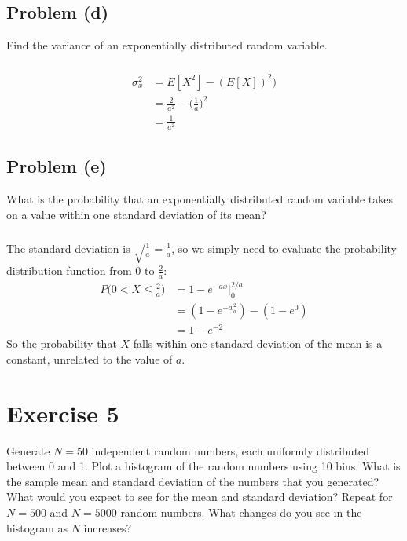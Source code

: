 \documentclass[11pt]{article}
\begin{document}
\subsection*{Problem (d)}
Find the variance of an exponentially distributed random variable.

\subparagraph*{}
\begin{align*}
	\sigma_x^2 &= E[X^2]-(E[X])^2)\\
	&= \frac{2}{a^2} - \Big(\frac{1}{a}\Big)^2 \\
	&= \frac{1}{a^2}
\end{align*}

\subsection*{Problem (e)}
What is the probability that an exponentially distributed random variable takes on a value within one standard deviation of its mean?

\subparagraph*{}
The standard deviation is $\sqrt{\frac{1}{a}}=\frac{1}{a}$, so we simply need to evaluate the probability distribution function from $0$ to $\frac{2}{a}$:
\begin{align*}
	P\Big(0<X\leq\frac{2}{a}\Big) &= 1-e^{-ax}\Big|_0^{2/a} \\
	&= (1-e^{-a\frac{2}{a}})-(1-e^0) \\
	&= 1-e^{-2}
\end{align*}
So the probability that $X$ falls within one standard deviation of the mean is a constant, unrelated to the value of $a$.

\section*{Exercise 5}
Generate $N=50$ independent random numbers, each uniformly distributed between 0 and 1. Plot a histogram of the random numbers using 10 bins. What is the sample mean and standard deviation of the numbers that you generated? What would you expect to see for the mean and standard deviation? Repeat for $N=500$ and $N=5000$ random numbers. What changes do you see in the histogram as $N$ increases?
\end{document}
